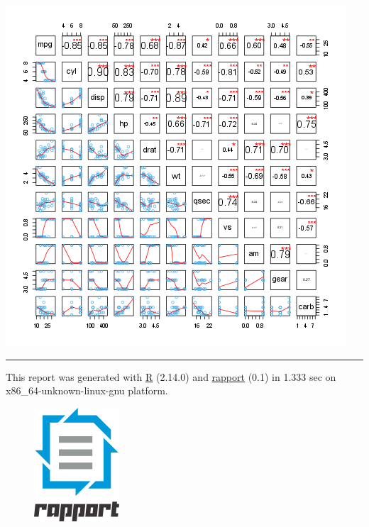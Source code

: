 \documentclass[]{article}
\makeatletter
\def\maxwidth{\ifdim\Gin@nat@width>\linewidth\linewidth
\else\Gin@nat@width\fi}
\let\Oldincludegraphics\includegraphics
\renewcommand{\includegraphics}[1]{\Oldincludegraphics[width=\maxwidth]{#1}}
\makeatother
\begin{document}
\href{82a0f381195bb4f50da3c943e264add1-hires.png}{\includegraphics{82a0f381195bb4f50da3c943e264add1.png}}

\begin{center}\rule{3in}{0.4pt}\end{center}

This report was generated with \href{http://www.r-project.org/}{R}
(2.14.0) and \href{http://al3xa.github.com/rapport/}{rapport} (0.1) in
1.333 sec on x86\_64-unknown-linux-gnu platform.

\begin{figure}[htbp]
\centering
\includegraphics{images/logo.png}
\caption{}
\end{figure}
\end{document}
